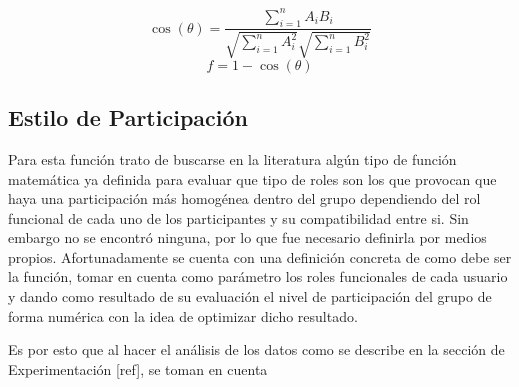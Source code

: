 \begin{equation} \label{eq_cos_sym}
    \cos(\theta) = \frac{ \sum\limits_{i=1}^{n}{A_i  B_i} }{ \sqrt{\sum\limits_{i=1}^{n}{A_i^2}}  \sqrt{\sum\limits_{i=1}^{n}{B_i^2}} }   
\end{equation}
\begin{equation}\label{eq_interests}
	f = 1 - \cos(\theta) 
\end{equation}

\subsection{Estilo de Participación}

Para esta función trato de buscarse en la literatura algún tipo de función matemática ya definida para evaluar que tipo de roles son los que provocan que haya una participación más homogénea dentro del grupo dependiendo del rol funcional de cada uno de los participantes y su compatibilidad entre si. Sin embargo no se encontró ninguna, por lo que fue necesario definirla por medios propios. Afortunadamente se cuenta con una definición concreta de como debe ser la función, tomar en cuenta como parámetro los roles funcionales de cada usuario y dando como resultado de su evaluación el nivel de participación del grupo de forma numérica con la idea de optimizar dicho resultado.

Es por esto que al hacer el análisis de los datos como se describe en la sección de Experimentación [ref], se toman en cuenta 



